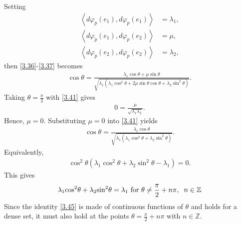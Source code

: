 \documentclass[a4paper]{article}
\numberwithin{equation}{section}
\begin{document}
Setting
\begin{align}
\label{3.38}
\left\langle {d{\varphi _p}\left( {{e_1}} \right),d{\varphi _p}\left( {{e_1}} \right)} \right\rangle  &= {\lambda _1},\\
\left\langle {d{\varphi _p}\left( {{e_1}} \right),d{\varphi _p}\left( {{e_2}} \right)} \right\rangle  &= \mu ,\\
\left\langle {d{\varphi _p}\left( {{e_2}} \right),d{\varphi _p}\left( {{e_2}} \right)} \right\rangle  &= {\lambda _2}, \label{3.40}
\end{align}
then \eqref{3.36}-\eqref{3.37} becomes
\begin{align}
\label{3.41}
\cos \theta  = \frac{{{\lambda _1}\cos \theta  + \mu \sin \theta }}{{\sqrt {{\lambda _1}\left( {{\lambda _1}{{\cos }^2}\theta  + 2\mu \sin \theta \cos \theta  + {\lambda _2}{{\sin }^2}\theta } \right)} }}.
\end{align}
Taking $\theta =\frac{\pi}{2}$ with \eqref{3.41} gives
\begin{align}
0 = \frac{\mu }{{\sqrt {{\lambda _1}{\lambda _2}} }}.
\end{align}
Hence, $\mu =0$. Substituting $\mu =0$ into \eqref{3.41} yields
\begin{align}
\cos \theta  = \frac{{{\lambda _1}\cos \theta }}{{\sqrt {{\lambda _1}\left( {{\lambda _1}{{\cos }^2}\theta  + {\lambda _2}{{\sin }^2}\theta } \right)} }}.
\end{align}
Equivalently, 
\begin{align}
{\cos ^2}\theta \left( {{\lambda _1}{{\cos }^2}\theta  + {\lambda _2}{{\sin }^2}\theta  - {\lambda _1}} \right) = 0.
\end{align}
This gives
\begin{align}
\label{3.45}
{\lambda _1}{\cos ^2}\theta  + {\lambda _2}{\sin ^2}\theta  = {\lambda _1}\mbox{ for } \theta  \ne \frac{\pi }{2} + n\pi , \hspace{0.2cm} n \in \mathbb{Z}
\end{align}
Since the identity \eqref{3.45} is made of continuous functions of $\theta$ and holds for a dense set, it must also hold at the points $\theta = \frac{\pi }{2} + n\pi$ with $n \in \mathbb{Z}$. 
\end{document}
